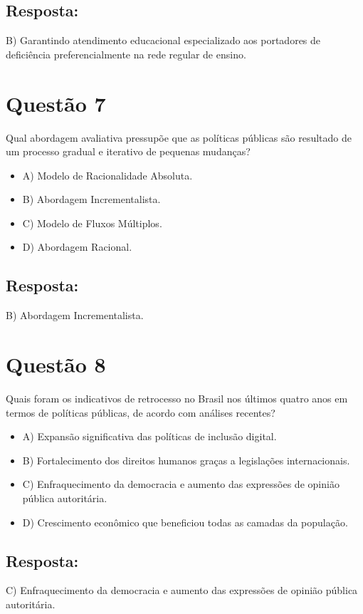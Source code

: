 \documentclass[
   article,       
   12pt,          
   oneside,       
   a4paper,       
   english,       
   brazil,        
   sumario=tradicional
   ]{abntex2}
\begin{document}
\subsection{Resposta:}
B) Garantindo atendimento educacional especializado aos portadores de deficiência preferencialmente na rede regular de ensino.

\section{Questão 7}
Qual abordagem avaliativa pressupõe que as políticas públicas são resultado de um processo gradual e iterativo de pequenas mudanças?
\begin{itemize}
    \item A) Modelo de Racionalidade Absoluta.
    \item B) Abordagem Incrementalista.
    \item C) Modelo de Fluxos Múltiplos.
    \item D) Abordagem Racional.
\end{itemize}
\subsection{Resposta:}
B) Abordagem Incrementalista.

\section{Questão 8}
Quais foram os indicativos de retrocesso no Brasil nos últimos quatro anos em termos de políticas públicas, de acordo com análises recentes?
\begin{itemize}
    \item A) Expansão significativa das políticas de inclusão digital.
    \item B) Fortalecimento dos direitos humanos graças a legislações internacionais.
    \item C) Enfraquecimento da democracia e aumento das expressões de opinião pública autoritária.
    \item D) Crescimento econômico que beneficiou todas as camadas da população.
\end{itemize}
\subsection{Resposta:}
C) Enfraquecimento da democracia e aumento das expressões de opinião pública autoritária.
\end{document}
